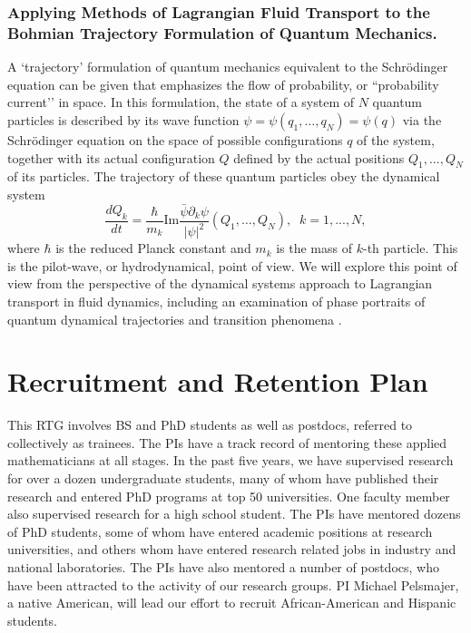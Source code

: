 \documentclass[11pt]{NSFamsart}
\begin{document}
\subsubsection*{Applying Methods of Lagrangian Fluid Transport to the Bohmian Trajectory Formulation of Quantum Mechanics.}   A `trajectory'  formulation of quantum mechanics  equivalent to the Schr\"{o}dinger equation can be given \cite{Bohmian, Holland1993TheQT} that emphasizes the flow of probability, or ``probability current’’ in space. 
In this formulation, the state of a system of $N$ quantum particles is described by its wave function $\psi=\psi(q_1,…,q_N)=\psi(q)$ via the Schr\"{o}dinger equation  on the space of possible configurations $q$ of the system, together with its actual configuration $Q$ defined by the actual positions $Q_1,...,Q_N$ of its particles. The trajectory of these quantum particles obey the dynamical system
$$
\frac{dQ_k}{dt}= \frac{\hbar}{m_k} \text{Im} \frac{\bar\psi  \partial_k \psi}{|\psi|^2}(Q_1,…,Q_N),\;\; k=1, ..., N,  $$
where $\hbar$ is the reduced Planck constant and $m_k$ is the mass of $k$-th particle.
This is the pilot-wave, or hydrodynamical, point of view. We will explore this point of view from the perspective of the dynamical systems approach to Lagrangian transport in fluid dynamics, including an examination of phase portraits of quantum dynamical trajectories \cite{Berndl1995OnTG} and transition phenomena \cite{waalkens2007wigner,Micha2006QuantumDW, Dittrich2016}. 


\section{Recruitment and Retention Plan} \label{sec:RandR}
This RTG involves BS and PhD students as well as postdocs, referred to collectively as trainees.  The PIs have a track record of mentoring these applied mathematicians at all stages.  In the past five years, we have supervised research for over a dozen undergraduate students, many of whom have published their research and entered PhD programs at top 50 universities. One faculty member also supervised research for a high school student.  The PIs have  mentored dozens of PhD students, some of whom have entered academic positions at research universities, and others whom have entered research related jobs in industry and national laboratories.  The PIs have also mentored a number of postdocs, who have been attracted to the activity of our research groups. PI Michael Pelsmajer, a native American, will lead our effort to 
recruit African-American and Hispanic students.
\end{document}
